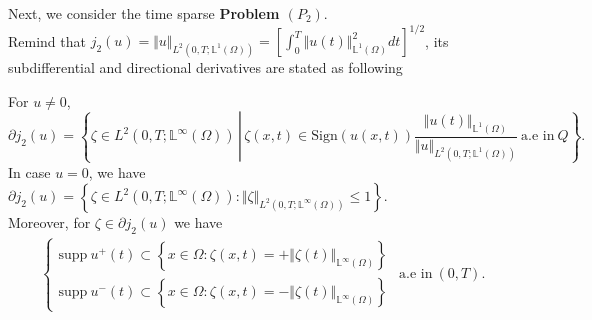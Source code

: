 \documentclass[reqno]{amsart}
\begin{document}
	Next, we consider the time sparse \textbf{Problem $(P_2)$}.\\
	Remind that $\displaystyle j_2(u)=\Vert u \Vert_{L^2(0,T;\mathbb{L}^1(\Omega))}=\left[ \int_0^T \Vert u(t) \Vert_{\mathbb{L}^1(\Omega)}^2 dt \right] ^{1/2}$, its subdifferential and directional derivatives are stated as following
	\begin{proposition}
		For $u\neq 0$, \begin{equation} \label{j2_1}
			\partial j_2(u)=\left\{ \zeta\in L^2(0,T;\mathbb{L}^\infty(\Omega)) \, \left| \, \zeta(x,t) \in \text{Sign} (u(x,t)) \frac{\Vert u(t) \Vert_{\mathbb{L}^1(\Omega)}}{\Vert u \Vert_{L^2(0,T;\mathbb{L}^1(\Omega))}} \ \text{a.e in} \ Q \right. \right\}.
		\end{equation}
		In case $u=0$, we have $\displaystyle \partial j_2(u)=\left\{\zeta \in L^2(0,T;\mathbb{L}^\infty(\Omega)): \Vert \zeta \Vert_{L^2(0,T;\mathbb{L}^\infty(\Omega))} \leq 1 \right\}$. \\
		Moreover, for $\zeta\in \partial j_2(u)$ we have
		\begin{equation} \label{j2_2}
			\begin{aligned}
				\begin{cases}
					\text{supp} \ u^+(t) \subset \left\{ x \in \Omega: \zeta(x,t)=+\Vert \zeta (t) \Vert_{\mathbb{L}^\infty (\Omega)} \right\} \\
					\text{supp} \ u^-(t) \subset \left\{ x\in \Omega: \zeta(x,t) = -\Vert \zeta(t) \Vert_{\mathbb{L}^\infty(\Omega)} \right \}
				\end{cases}
			\end{aligned}
			\text{a.e in} \ (0,T).
		\end{equation}
	\end{proposition}
	
\end{document}
